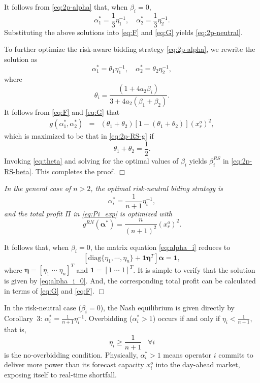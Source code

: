 \documentclass[conference]{IEEEtran}
\newcommand{\one}{\mathbf{1}}
\begin{document}
It follows from \eqref{eq:2p-alpha} that, when $\beta_i=0$,
\[ \alpha_1^* = \frac{1}{3}\eta_1^{-1}, \quad \alpha_2^* = \frac{1}{3}\eta_2^{-1}. \]
Substituting the above solutions into \eqref{eq:F} and \eqref{eq:G} yields \eqref{eq:2p-neutral}.

To further optimize the risk-aware bidding strategy \eqref{eq:2p-alpha}, we rewrite the solution as
\[ \alpha_1^* = \theta_1 \eta_1^{-1}, \quad \alpha_2^* = \theta_2\eta_2^{-1}, \]
where 
\begin{equation}
    \theta_i = \frac{(1+4a_2\beta_i)}{3+4a_2(\beta_1+\beta_2)}. \label{eq:theta}
\end{equation} 
It follows from \eqref{eq:F} and \eqref{eq:G} that 
\begin{eqnarray*}
    g(\alpha_1^*, \alpha_2^*) & = & (\theta_1+\theta_2) [1- (\theta_1+\theta_2)] (x_r^o)^2, 
\end{eqnarray*}
which is maximized to be that in \eqref{eq:2p-RS-g} if
\[ \theta_1+\theta_2=\frac{1}{2}. \]
Invoking \eqref{eq:theta} and solving for the optimal values of $\beta_i$ yields $\beta_i^{RS}$ in \eqref{eq:2p-RS-beta}. This completes the proof. \hfill $\Box$

 {\it In the general case of $n>2$, the optimal risk-neutral biding strategy is 
\begin{equation}
    \alpha_i^* = \frac{1}{n+1}\eta_i^{-1},\label{eq:alpha_i_0} 
\end{equation} 
and the total profit $\Pi$ in \eqref{eq:Pi_exp} is optimized with 
\[ g^{RN}(\boldsymbol{\alpha}^*)=\frac{n}{(n+1)^2} (x_r^o)^2. \]}

 It follows that, when $\beta_i=0$, the matrix equation \eqref{eq:alpha_i} reduces to 
\[ \left[\mbox{diag}\{\eta_1,\cdots,\eta_n\} + \one \boldsymbol{\eta}^T \right] \boldsymbol{\alpha}=\one, \]
where $\boldsymbol{\eta}=[\eta_1 \; \cdots \; \eta_n]^T$ and $\one=[1 \; \cdots \; 1]^T$. It is simple to verify that the solution is given by \eqref{eq:alpha_i_0}. And, the corresponding total profit can be calculated in terms of \eqref{eq:G} and \eqref{eq:F}.  \hfill $\Box$

In the risk-neutral case ($\beta_i = 0$), the Nash equilibrium is given directly by Corollary~3: $\alpha_i^* = \frac{1}{n+1}\eta_i^{-1}$. Overbidding ($\alpha_i^* > 1$) occurs if and only if $\eta_i < \frac{1}{n+1}$, that is,
\begin{equation}
    \eta_i \geq \frac{1}{n+1} \;\;\; \forall i \label{eq:eta_0}
\end{equation}
is the no-overbidding condition. Physically, $\alpha_i^* > 1$ means operator $i$ commits to deliver more power than its forecast capacity $x_i^o$ into the day-ahead market, exposing itself to real-time shortfall.
\end{document}
